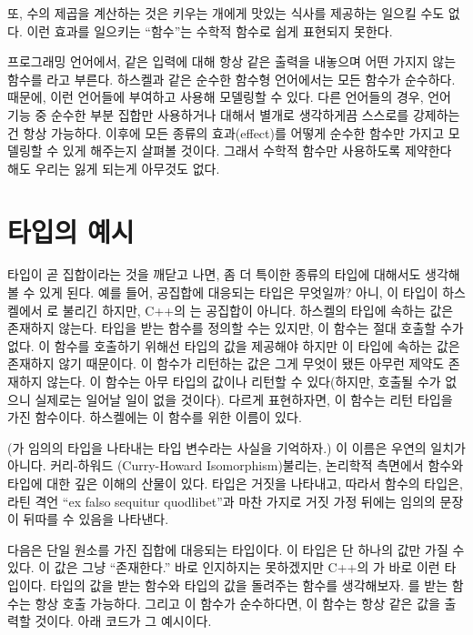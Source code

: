 또, 수의 제곱을 계산하는 것은 키우는 개에게 맛있는 식사를 제공하는 \trSideEffect\를 일으킬 수도 없다. 이런 효과를 일으키는 ``함수''는 수학적 함수로 쉽게 표현되지 못한다.

프로그래밍 언어에서, 같은 입력에 대해 항상 같은 출력을 내놓으며 어떤  가지지 않는 함수를 라고 부른다.
하스켈과 같은 순수한 함수형 언어에서는 모든 함수가 순수하다. 때문에, 이런 언어들에 \trDenotationalSemantics\를 부여하고 \trCategoryTheory\를 사용해 모델링할 수 있다.
다른 언어들의 경우, 언어 기능 중 순수한 부분 집합만 사용하거나  대해서 별개로 생각하게끔 스스로를 강제하는건 항상 가능하다.
이후에 \trMonad\가 모든 종류의 효과(effect)를 어떻게 순수한 함수만 가지고 모델링할 수 있게 해주는지 살펴볼 것이다.
그래서 수학적 함수만 사용하도록 제약한다 해도 우리는 잃게 되는게 아무것도 없다.

\section{타입의 예시}

타입이 곧 집합이라는 것을 깨닫고 나면, 좀 더 특이한 종류의 타입에 대해서도 생각해 볼 수 있게 된다.
예를 들어, 공집합에 대응되는 타입은 무엇일까? 아니, 이 타입이 하스켈에서 로 불리긴 하지만, C++의 는 공집합이 아니다. 
하스켈의  타입에 속하는 값은 존재하지 않는다.  타입을 받는 함수를 정의할 수는 있지만, 이 함수는 절대 호출할 수가 없다.
이 함수를 호출하기 위해선  타입의 값을 제공해야 하지만 이 타입에 속하는 값은 존재하지 않기 때문이다. 
이 함수가 리턴하는 값은 그게 무엇이 됐든 아무런 제약도 존재하지 않는다. 이 함수는 아무 타입의 값이나 리턴할 수 있다(하지만, 호출될 수가 없으니 실제로는 일어날 일이 없을 것이다).
다르게 표현하자면, 이 함수는 \trPolymorphic 리턴 타입을 가진 함수이다. 하스켈에는 이 함수를 위한 이름이 있다.


(가 임의의 타입을 나타내는 타입 변수라는 사실을 기억하자.)
이 이름은 우연의 일치가 아니다. 커리-하워드 \trIsomorphism(Curry-Howard Isomorphism) 불리는, 논리학적 측면에서 함수와 타입에 대한 깊은 이해의 산물이 있다.
 타입은 거짓을 나타내고, 따라서  함수의 타입은, 라틴 격언 ``ex falso sequitur quodlibet''과 마찬 가지로 거짓 가정 뒤에는 임의의 문장이 뒤따를 수 있음을 나타낸다.

다음은 단일 원소를 가진 집합에 대응되는 타입이다. 이 타입은 단 하나의 값만 가질 수 있다. 이 값은 그냥 ``존재한다.''
바로 인지하지는 못하겠지만 C++의 가 바로 이런 타입이다.  타입의 값을 받는 함수와  타입의 값을 돌려주는 함수를 생각해보자.
를 받는 함수는 항상 호출 가능하다. 그리고 이 함수가 순수하다면, 이 함수는 항상 같은 값을 출력할 것이다. 아래 코드가 그 예시이다.

